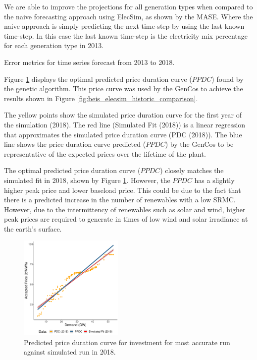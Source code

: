 We are able to improve the projections for all generation types when compared to the naive forecasting approach using ElecSim, as shown by the MASE. Where the naive approach is simply predicting the next time-step by using the last known time-step. In this case the last known time-step is the electricity mix percentage for each generation type in 2013. 

\begin{table}[htb]
	\centering
	\caption{Error metrics for time series forecast from 2013 to 2018.}
	\label{table:metrics}
\end{table}

Figure \ref{fig:best_price_curve} displays the optimal predicted price duration curve ($PPDC$) found by the genetic algorithm. This price curve was used by the GenCos to achieve the results shown in Figure \ref{fig:beis_elecsim_historic_comparison}. 

The yellow points show the simulated price duration curve for the first year of the simulation (2018). The red line (Simulated Fit (2018)) is a linear regression that approximates the simulated price duration curve (PDC (2018)). The blue line shows the price duration curve predicted ($PPDC$) by the GenCos to be representative of the expected prices over the lifetime of the plant.


The optimal predicted price duration curve ($PPDC$) closely matches the simulated fit in 2018, shown by Figure \ref{fig:best_price_curve}. However, the $PPDC$ has a slightly higher peak price and lower baseload price. This could be due to the fact that there is a predicted increase in the number of renewables with a low SRMC. However, due to the intermittency of renewables such as solar and wind, higher peak prices are required to generate in times of low wind and solar irradiance at the earth's surface.



\begin{figure}
	\centering
	\includegraphics[width=0.45\textwidth]{Chapter4/figures/e-Energy-2020/results/best_run_price_dur_curve.pdf}
	\caption{Predicted price duration curve for investment for most accurate run against simulated run in 2018.}
	\label{fig:best_price_curve}
\end{figure}



